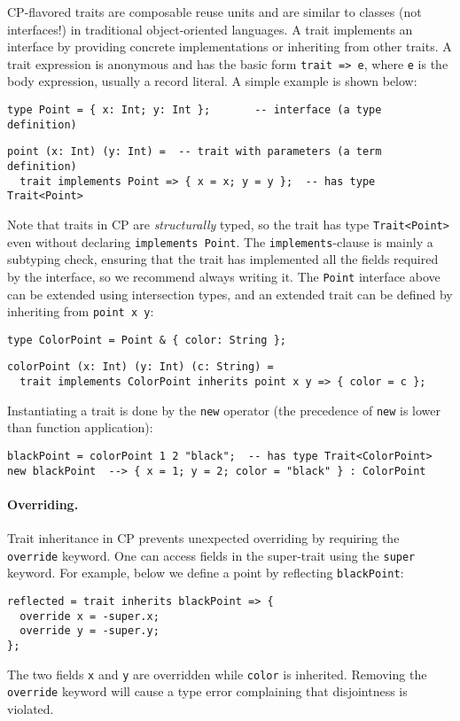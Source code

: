 CP-flavored traits are composable reuse units and are similar to classes (not
interfaces!) in traditional object-oriented languages. A trait implements an
interface by providing concrete implementations or inheriting from other traits.
A trait expression is anonymous and has the basic form \lstinline{trait => e},
where \lstinline{e} is the body expression, usually a record literal. A simple
example is shown below:
\begin{lstlisting}
type Point = { x: Int; y: Int };       -- interface (a type definition)
\end{lstlisting}
\vspace{-1ex}
\begin{lstlisting}
point (x: Int) (y: Int) =  -- trait with parameters (a term definition)
  trait implements Point => { x = x; y = y };  -- has type Trait<Point>
\end{lstlisting}
Note that traits in CP are \emph{structurally} typed, so the trait has type
\lstinline{Trait<Point>} even without declaring \lstinline{implements Point}.
The \lstinline{implements}-clause is mainly a subtyping check, ensuring that the
trait has implemented all the fields required by the interface, so we recommend
always writing it. The \lstinline{Point} interface above can be extended using
intersection types, and an extended trait can be defined by inheriting from
\lstinline{point x y}:
\begin{lstlisting}
type ColorPoint = Point & { color: String };
\end{lstlisting}
\vspace{-1ex}
\begin{lstlisting}
colorPoint (x: Int) (y: Int) (c: String) =
  trait implements ColorPoint inherits point x y => { color = c };
\end{lstlisting}
Instantiating a trait is done by the \lstinline{new} operator (the precedence of
\lstinline{new} is lower than function application):
\begin{lstlisting}
blackPoint = colorPoint 1 2 "black";  -- has type Trait<ColorPoint>
new blackPoint  --> { x = 1; y = 2; color = "black" } : ColorPoint
\end{lstlisting}

\paragraph{Overriding.}
Trait inheritance in CP prevents unexpected overriding by requiring the
\lstinline{override} keyword. One can access fields in the super-trait using the
\lstinline{super} keyword. For example, below we define a point by reflecting
\lstinline{blackPoint}:
\begin{lstlisting}
reflected = trait inherits blackPoint => {
  override x = -super.x;
  override y = -super.y;
};
\end{lstlisting}
The two fields \lstinline{x} and \lstinline{y} are overridden while
\lstinline{color} is inherited. Removing the \lstinline{override} keyword will
cause a type error complaining that disjointness is violated.

